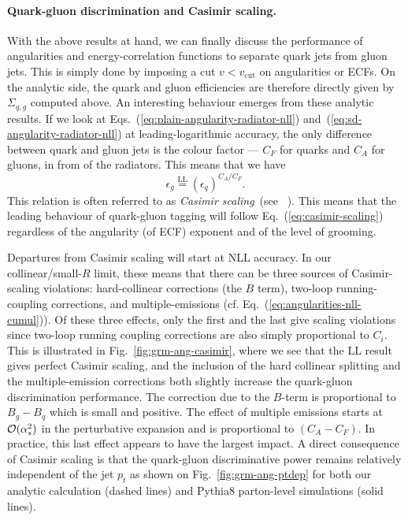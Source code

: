 \paragraph{Quark-gluon discrimination and Casimir scaling.}
%
With the above results at hand, we can finally discuss the performance
of angularities and energy-correlation functions to separate quark
jets from gluon jets. This is simply done by imposing a cut
$v<v_\text{cut}$ on angularities or ECFs.
%
On the analytic side, the quark and gluon efficiencies are therefore
directly given by $\Sigma_{q,g}$  computed above.
%
An interesting behaviour emerges from these analytic results. If we
look at Eqs.~(\ref{eq:plain-angularity-radiator-nll})
and~(\ref{eq:sd-angularity-radiator-nll}) at leading-logarithmic
accuracy, the only difference between quark and gluon jets is the
colour factor --- $C_F$ for quarks and $C_A$ for gluons, in from of
the radiators. This means that we have
\begin{equation}\label{eq:casimir-scaling}
\epsilon_g \overset{\text{LL}}{=} (\epsilon_q)^{C_A/C_F}.
\end{equation}
%
This relation is often referred to as {\em Casimir scaling}~(see
\eg~\cite{Larkoski:2013eya}). This means that the leading behaviour of
quark-gluon tagging will follow Eq.~(\ref{eq:casimir-scaling}) regardless
of the angularity (of ECF) exponent and of the level of grooming.

Departures from Casimir scaling will start at NLL accuracy. In our
collinear/small-$R$ limit, these means that there can be three sources of
Casimir-scaling violations: hard-collinear corrections (the $B$ term),
two-loop running-coupling corrections, and multiple-emissions
(cf. Eq.~(\ref{eq:angularities-nll-cumul})). 
%
Of these three effects, only the first and the last give scaling
violations since two-loop running coupling corrections are also simply
proportional to $C_i$.
%
This is illustrated in Fig.~\ref{fig:grm-ang-casimir}, where we see
that the LL result gives perfect Casimir scaling, and the inclusion of
the hard collinear splitting and the multiple-emission corrections
both slightly increase the quark-gluon discrimination performance.
%
The correction due to the $B$-term is proportional to $B_g-B_q$ which
is small and positive. The effect of multiple emissions starts at
${\cal {O}}(\alpha_s^2)$ in the perturbative expansion and is
proportional to $(C_A-C_F)$.
%
In practice, this last effect appears to have the largest impact.
%
A direct consequence of Casimir scaling is that the quark-gluon
discriminative power remains relatively independent of the jet $p_t$
as shown on Fig.~\ref{fig:grm-ang-ptdep} for both our analytic
calculation (dashed lines) and Pythia8 parton-level simulations (solid
lines).

